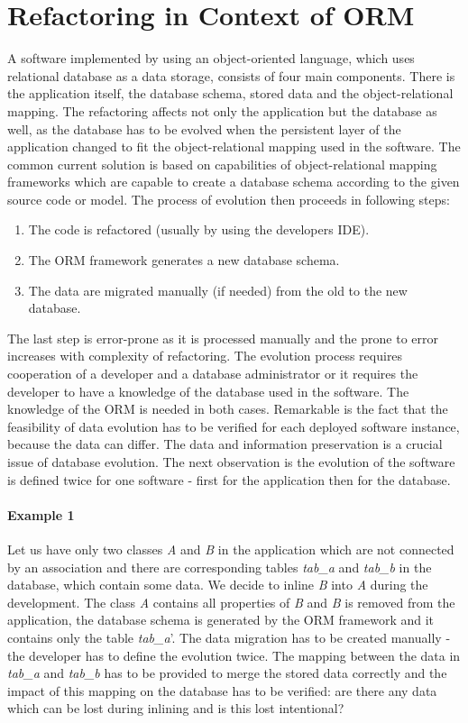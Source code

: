 \documentclass[runningheads]{comsis}
\begin{document}
\section{Refactoring in Context of ORM} 
\label{sec:problem}
A software implemented by using an object-oriented language, which uses relational database as a data storage, consists of four main components. There is the application itself, the database schema, stored data and the object-relational mapping. The refactoring affects not only the application but the database as well, as the database has to be evolved when the persistent layer of the application changed to fit the object-relational mapping used in the software. The common current solution is based on capabilities of object-relational mapping frameworks which are capable to create a database schema according to the given source code or model. The process of evolution then proceeds in following steps:
\begin{enumerate}
	\item The code is refactored (usually by using the developers IDE).
	\item The ORM framework generates a new database schema.
	\item The data are migrated manually (if needed) from the old to the new database.
\end{enumerate}
The last step is error-prone as it is processed manually and the prone to error increases with complexity of refactoring. The evolution process requires cooperation of a developer and a database administrator or it requires the developer to have a knowledge of the database used in the software. The knowledge of the ORM is needed in both cases. Remarkable is the fact that the feasibility of data evolution has to be verified for each deployed software instance, because the data can differ. The data and information preservation is a crucial issue of database evolution. The next observation is the evolution of the software is defined twice for one software - first for the application then for the database. 

\paragraph{Example 1} Let us have only two classes \emph{A} and \emph{B} in the application which are not connected by an association and there are corresponding tables \emph{tab\_a} and \emph{tab\_b} in the database, which contain some data. We decide to inline \emph{B} into \emph{A}  during the development. The class \emph{A} contains all properties of \emph{B} and \emph{B} is removed from the application, the database schema is generated by the ORM framework and it contains only the table \emph{tab\_a}'. The data migration has to be created manually - the developer has to define the evolution twice. The mapping between the data in \emph{tab\_a} and \emph{tab\_b} has to be provided to merge the stored data correctly and the impact of this mapping on the database has to be verified: are there any data which can be lost during inlining and is this lost intentional? 
\end{document}

